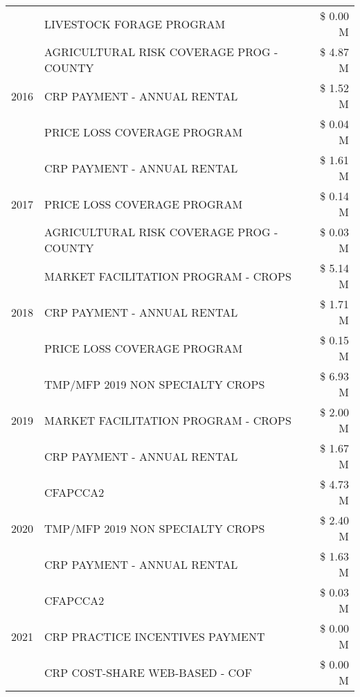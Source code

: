 \begin{tabular}{llr}
 & LIVESTOCK FORAGE PROGRAM & \$ 0.00 M \\
\cline{1-3}
\multirow[t]{3}{*}{2016} & AGRICULTURAL RISK COVERAGE PROG - COUNTY & \$ 4.87 M \\
 & CRP PAYMENT - ANNUAL RENTAL & \$ 1.52 M \\
 & PRICE LOSS COVERAGE PROGRAM & \$ 0.04 M \\
\cline{1-3}
\multirow[t]{3}{*}{2017} & CRP PAYMENT - ANNUAL RENTAL & \$ 1.61 M \\
 & PRICE LOSS COVERAGE PROGRAM & \$ 0.14 M \\
 & AGRICULTURAL RISK COVERAGE PROG - COUNTY & \$ 0.03 M \\
\cline{1-3}
\multirow[t]{3}{*}{2018} & MARKET FACILITATION PROGRAM - CROPS & \$ 5.14 M \\
 & CRP PAYMENT - ANNUAL RENTAL & \$ 1.71 M \\
 & PRICE LOSS COVERAGE PROGRAM & \$ 0.15 M \\
\cline{1-3}
\multirow[t]{3}{*}{2019} & TMP/MFP 2019 NON SPECIALTY CROPS & \$ 6.93 M \\
 & MARKET FACILITATION PROGRAM - CROPS & \$ 2.00 M \\
 & CRP PAYMENT - ANNUAL RENTAL & \$ 1.67 M \\
\cline{1-3}
\multirow[t]{3}{*}{2020} & CFAPCCA2 & \$ 4.73 M \\
 & TMP/MFP 2019 NON SPECIALTY CROPS & \$ 2.40 M \\
 & CRP PAYMENT - ANNUAL RENTAL & \$ 1.63 M \\
\cline{1-3}
\multirow[t]{3}{*}{2021} & CFAPCCA2 & \$ 0.03 M \\
 & CRP PRACTICE INCENTIVES PAYMENT & \$ 0.00 M \\
 & CRP COST-SHARE WEB-BASED - COF & \$ 0.00 M \\
\cline{1-3}
\bottomrule
\end{tabular}
